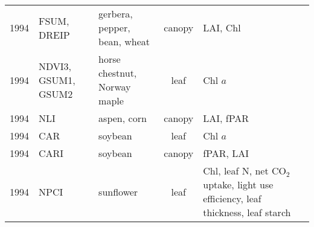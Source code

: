 \documentclass[10pt]{article}
\begin{document}
{\begin{ThreePartTable}
\begin{longtable}{c M{1.5in} M{2.5in} c M{1.5in} M{1.5in}}
  1994 & FSUM, DREIP                                     & gerbera, pepper, bean, wheat                                                                                                                                                                                                                          & canopy       & LAI, Chl                                                                                 & \citet{Filella1994,Filella1995}                     \\
  1994 & NDVI3, GSUM1, GSUM2                             & horse chestnut, Norway maple                                                                                                                                                                                                                          & leaf         & Chl $a$                                                                                  & \citet{Gitelson1994}                                \\
  1994 & NLI                                             & aspen, corn                                                                                                                                                                                                                                           & canopy       & LAI, fPAR                                                                                & \citet{Goel1994}                                    \\
  1994 & CAR                                             & soybean                                                                                                                                                                                                                                               & leaf         & Chl $a$                                                                                  & \citet{Kim1994}                                     \\
  1994 & CARI                                            & soybean                                                                                                                                                                                                                                               & canopy       & fPAR, LAI                                                                                & \citet{Kim1994}                                     \\
  1994 & NPCI                                            & sunflower                                                                                                                                                                                                                                             & leaf         & Chl, leaf N, net CO$_2$ uptake, light use efficiency, leaf thickness, leaf starch        & \citet{Penuelas1994}                                \\

\end{longtable}
\end{ThreePartTable}}
\end{document}
